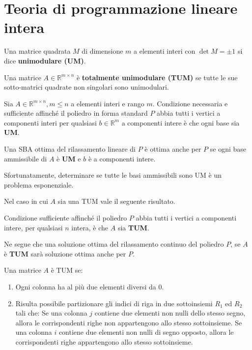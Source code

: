 \documentclass[\main/main.tex]{subfiles}
\begin{document}
\chapter{Teoria di programmazione lineare intera}

\begin{definition}
  Una matrice quadrata $M$ di dimensione $m$ a elementi interi con $\det M = \pm 1$ si dice \textbf{unimodulare (UM)}.
\end{definition}

\begin{definition}
  Una matrice $A \in \mathbb{R}^{m\times n}$ è \textbf{totalmente unimodulare (TUM)} se tutte le sue sotto-matrici quadrate non singolari sono unimodulari.
\end{definition}

\begin{theorem}
  Sia $A  \in \mathbb{R}^{m \times n}, m \leq n$ a elementi interi e rango $m$. Condizione necessaria e sufficiente affinché il poliedro in forma standard $P$ abbia tutti i vertici a componenti interi per qualsiasi $b \in \mathbb{R}^m$ a componenti intere è che ogni base sia \textbf{UM}.
\end{theorem}

\begin{theorem}
  Una SBA ottima del rilassamento lineare di $P$ è ottima anche per $P$ se ogni base ammissibile di $A$ è \textbf{UM} e $b$ è a componenti intere.
\end{theorem}

Sfortunatamente, determinare se tutte le basi ammissibili sono UM è un problema esponenziale.

Nel caso in cui $A$ sia una TUM vale il seguente risultato.

\begin{theorem}
  Condizione sufficiente affinché il poliedro $P$ abbia tutti i vertici a componenti intere, per qualsiasi $n$ intera, è che $A$ sia \textbf{TUM}.

  Ne segue che una soluzione ottima del rilassamento continuo del poliedro $P$, se $A$ è \textbf{TUM} sarà soluzione ottima anche per $P$.
\end{theorem}

\begin{theorem}
  Una matrice $A$ è TUM se:
  \begin{enumerate}
    \item Ogni colonna ha al più due elementi diversi da 0.
    \item Risulta possibile partizionare gli indici di riga in due sottoinsiemi $R_1$ ed $R_2$ tali che:
          \subitem Se una colonna $j$ contiene due elementi non nulli dello stesso segno, allora le corrispondenti righe non appartengono allo stesso sottoinsieme.
          \subitem Se una colonna $i$ contiene due elementi non nulli di segno opposto, allora le corrispondenti righe appartengono allo stesso sottoinsieme.
  \end{enumerate}
\end{theorem}
\end{document}
